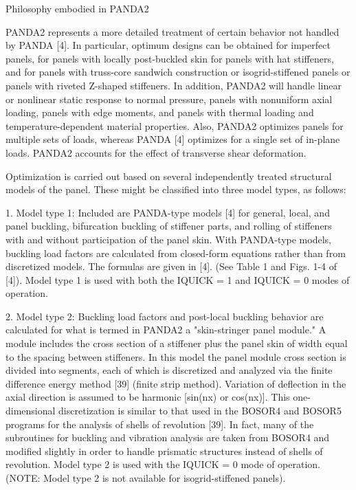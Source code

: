 Philosophy embodied in PANDA2

PANDA2 represents a more detailed treatment of certain behavior not
handled by PANDA [4].  In particular, optimum designs can be obtained for
imperfect panels, for panels with locally post-buckled skin for panels
with hat stiffeners, and for panels with truss-core sandwich construction
or isogrid-stiffened panels or panels with riveted Z-shaped stiffeners. In
addition, PANDA2 will handle linear or nonlinear static response to normal
pressure, panels with nonuniform axial loading, panels with edge moments,
and panels with thermal loading and temperature-dependent material
properties. Also, PANDA2 optimizes panels for multiple sets of loads,
whereas PANDA [4] optimizes for a single set of in-plane loads.  PANDA2
accounts for the effect of transverse shear deformation. 

Optimization is carried out based on several independently treated
structural models of the panel.  These might be classified into three
model types, as follows: 

1. Model type 1: Included are PANDA-type models [4] for general, local,
and panel buckling, bifurcation buckling of stiffener parts, and rolling
of stiffeners with and without participation of the panel skin.  With
PANDA-type models, buckling load factors are calculated from closed-form
equations rather than from discretized models. The formulas are given in
[4].  (See Table 1 and Figs. 1-4 of [4]). Model type 1 is used with both
the IQUICK = 1 and IQUICK = 0 modes of operation. 

2. Model type 2: Buckling load factors and post-local buckling behavior
are calculated for what is termed in PANDA2 a "skin-stringer panel
module."  A module includes the cross section of a stiffener plus the
panel skin of width equal to the spacing between stiffeners.  In this
model the panel module cross section is divided into segments, each of
which is discretized and analyzed via the finite difference energy method
[39] (finite strip method). Variation of deflection in the axial direction
is assumed to be harmonic [sin(nx) or cos(nx)].  This one-dimensional
discretization is similar to that used in the BOSOR4 and BOSOR5 programs
for the analysis of shells of revolution [39]. In fact, many of the
subroutines for buckling and vibration analysis are taken from BOSOR4 and
modified slightly in order to handle prismatic structures instead of
shells of revolution.  Model type 2 is used with the IQUICK = 0 mode of
operation. (NOTE: Model type 2 is not available for isogrid-stiffened
panels). 

